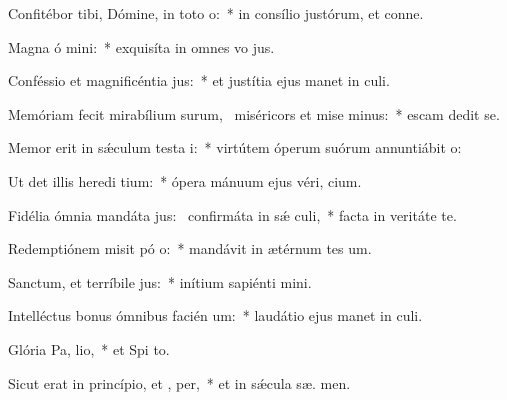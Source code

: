 \item Confitébor tibi, Dómine, in toto  o:~* in consílio justórum, et conne.
\item Magna ó mini:~* exquisíta in omnes vo jus.
\item Conféssio et magnificéntia  jus:~* et justítia ejus manet in  culi.
\item Memóriam fecit mirabílium surum,~\pscross{} miséricors et mise minus:~* escam dedit  se.
\item Memor erit in sǽculum testa i:~* virtútem óperum suórum annuntiábit  o:
\item Ut det illis heredi tium:~* ópera mánuum ejus véri,  cium.
\item Fidélia ómnia mandáta jus:~\pscross{} confirmáta in sǽ culi,~* facta in veritáte  te.
\item Redemptiónem misit pó o:~* mandávit in ætérnum tes um.
\item Sanctum, et terríbile  jus:~* inítium sapiénti  mini.
\item Intelléctus bonus ómnibus facién um:~* laudátio ejus manet in  culi.
\item Glória Pa,  lio,~* et Spi to.
\item Sicut erat in princípio, et ,  per,~* et in sǽcula sæ. men.
